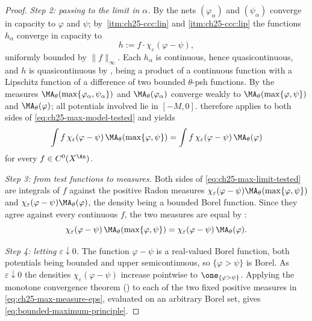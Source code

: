 \begin{proof}
\emph{Step 2: passing to the limit in \(\alpha\).}  By
 the nets
\((\varphi_\alpha)\) and \((\psi_\alpha)\) converge in capacity to
\(\varphi\) and \(\psi\); by
\,\cref{itm:ch25-ccc:lin} and
\cref{itm:ch25-ccc:lip} the functions
\(h_\alpha\) converge in capacity to
\[
 h:=f\cdot\chi_\varepsilon(\varphi-\psi),
\]
uniformly bounded by \(\|f\|_\infty\).  Each \(h_\alpha\) is continuous,
hence quasicontinuous, and \(h\) is quasicontinuous by
, being a product of a continuous
function with a Lipschitz function of a difference of two bounded
\(\theta\)-psh functions.  By  the measures
\(\MA_\theta(\max\{\varphi_\alpha,\psi_\alpha\})\) and
\(\MA_\theta(\varphi_\alpha)\) converge weakly to
\(\MA_\theta(\max\{\varphi,\psi\})\) and \(\MA_\theta(\varphi)\); all
potentials involved lie in \([-M,0]\).   therefore
applies to both sides of \eqref{eq:ch25-max-model-tested} and yields
\begin{equation}
\label{eq:ch25-max-limit-tested}
 \int f\,\chi_\varepsilon(\varphi-\psi)\,
   \MA_\theta(\max\{\varphi,\psi\})
 =\int f\,\chi_\varepsilon(\varphi-\psi)\,\MA_\theta(\varphi)
\end{equation}
for every \(f\in C^0(X^{\An})\).

\emph{Step 3: from test functions to measures.}  Both sides of
\eqref{eq:ch25-max-limit-tested} are integrals of \(f\) against the positive
Radon measures \(\chi_\varepsilon(\varphi-\psi)\MA_\theta(\max\{\varphi,
\psi\})\) and \(\chi_\varepsilon(\varphi-\psi)\MA_\theta(\varphi)\), the
density being a bounded Borel function.  Since they agree against every
continuous \(f\), the two measures are equal by
:
\begin{equation}
\label{eq:ch25-max-measure-eps}
 \chi_\varepsilon(\varphi-\psi)\,\MA_\theta(\max\{\varphi,\psi\})
 =\chi_\varepsilon(\varphi-\psi)\,\MA_\theta(\varphi) .
\end{equation}

\emph{Step 4: letting \(\varepsilon\downarrow0\).}  The function
\(\varphi-\psi\) is a real-valued Borel function, both potentials being
bounded and upper semicontinuous, so \(\{\varphi>\psi\}\) is Borel.  As
\(\varepsilon\downarrow0\) the densities
\(\chi_\varepsilon(\varphi-\psi)\) increase pointwise to
\(\one_{\{\varphi>\psi\}}\).  Applying the monotone convergence theorem
() to each of the two fixed positive measures in
\eqref{eq:ch25-max-measure-eps}, evaluated on an arbitrary Borel set, gives
\eqref{eq:bounded-maximum-principle}.


\end{proof}
